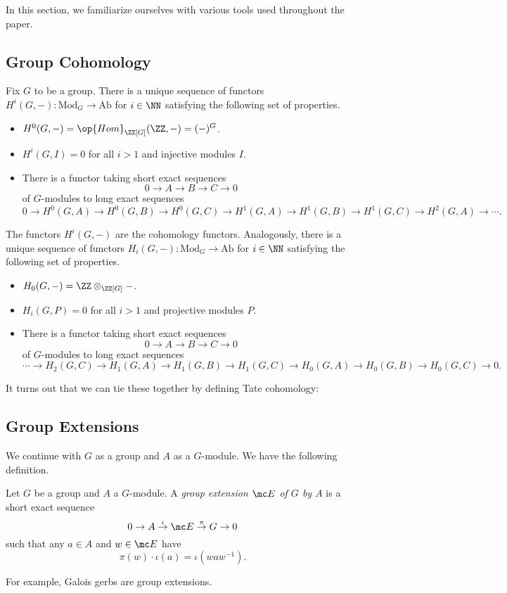 
In this section, we familiarize ourselves with various tools used throughout the paper.

\subsection{Group Cohomology}
Fix $G$ to be a group. There is a unique sequence of functors $H^i(G,-)\colon\mathrm{Mod}_G\to\mathrm{Ab}$ for $i\in\NN$ satisfying the following set of properties.
\begin{itemize}
	\item $H^0(G,-)=\op{Hom}_{\ZZ[G]}(\ZZ,-)=(-)^G$.
	\item $H^i(G,I)=0$ for all $i>1$ and injective modules $I$.
	\item There is a functor taking short exact sequences
	\[0\to A\to B\to C\to 0\]
	of $G$-modules to long exact sequences
	\[0\to H^0(G,A)\to H^0(G,B)\to H^0(G,C)\to H^1(G,A)\to H^1(G,B)\to H^1(G,C)\to H^2(G,A)\to\cdots.\]
\end{itemize}
The functors $H^i(G,-)$ are the cohomology functors. Analogously, there is a unique sequence of functors $H_i(G,-)\colon\mathrm{Mod}_G\to\mathrm{Ab}$ for $i\in\NN$ satisfying the following set of properties.
\begin{itemize}
	\item $H_0(G,-)=\ZZ\otimes_{\ZZ[G]}-$.
	\item $H_i(G,P)=0$ for all $i>1$ and projective modules $P$.
	\item There is a functor taking short exact sequences
	\[0\to A\to B\to C\to 0\]
	of $G$-modules to long exact sequences
	\[\cdots\to H_2(G,C)\to H_1(G,A)\to H_1(G,B)\to H_1(G,C)\to H_0(G,A)\to H_0(G,B)\to H_0(G,C)\to0.\]
\end{itemize}
It turns out that we can tie these together by defining Tate cohomology: 

\subsection{Group Extensions}
We continue with $G$ as a group and $A$ as a $G$-module. We have the following definition.
\begin{definition}
	Let $G$ be a group and $A$ a $G$-module. A \textit{group extension $\mc E$ of $G$ by $A$} is a short exact sequence
	\[0\to A\stackrel\iota\to\mc E\stackrel\pi\to G\to0\]
	such that any $a\in A$ and $w\in\mc E$ have
	\[\pi(w)\cdot\iota(a)=\iota\left(waw^{-1}\right).\]
\end{definition}
For example, Galois gerbs are group extensions.

